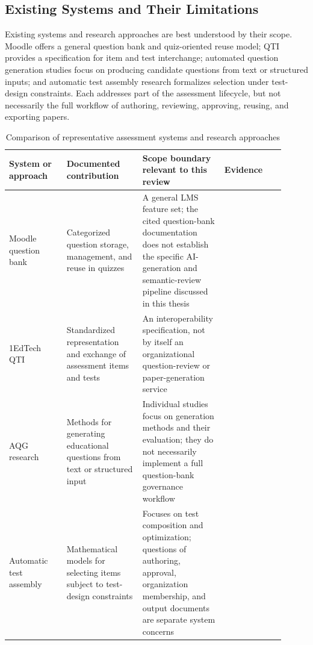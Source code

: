 \subsection{Existing Systems and Their Limitations}

Existing systems and research approaches are best understood by their scope. Moodle offers a general question bank and quiz-oriented reuse model; QTI provides a specification for item and test interchange; automated question generation studies focus on producing candidate questions from text or structured inputs; and automatic test assembly research formalizes selection under test-design constraints. Each addresses part of the assessment lifecycle, but not necessarily the full workflow of authoring, reviewing, approving, reusing, and exporting papers.

\begin{table}[H]
    \centering
    \caption{Comparison of representative assessment systems and research approaches}
    \label{tab:literature_system_comparison}
    \begin{tabular}{|p{0.19\linewidth}|p{0.25\linewidth}|p{0.27\linewidth}|p{0.20\linewidth}|}
        \hline
        \textbf{System or approach} & \textbf{Documented contribution} & \textbf{Scope boundary relevant to this review} & \textbf{Evidence} \\
        \hline
        Moodle question bank & Categorized question storage, management, and reuse in quizzes & A general LMS feature set; the cited question-bank documentation does not establish the specific AI-generation and semantic-review pipeline discussed in this thesis & \cite{moodleQuestionBank,moodleQuestionCategories} \\
        \hline
        1EdTech QTI & Standardized representation and exchange of assessment items and tests & An interoperability specification, not by itself an organizational question-review or paper-generation service & \cite{imsQti3} \\
        \hline
        AQG research & Methods for generating educational questions from text or structured input & Individual studies focus on generation methods and their evaluation; they do not necessarily implement a full question-bank governance workflow & \cite{hoshinoNakagawa2005,du2017,kurdi2020,singh2023ChatGPT} \\
        \hline
        Automatic test assembly & Mathematical models for selecting items subject to test-design constraints & Focuses on test composition and optimization; questions of authoring, approval, organization membership, and output documents are separate system concerns & \cite{vanDerLinden2005} \\
        \hline
    \end{tabular}
\end{table}

